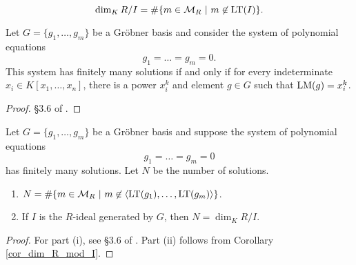 \begin{corollary}
  \label{cor_dim_R_mod_I}
  $$\dim_K R/I = \#\{ m \in \mathcal{M}_R ~|~ m \not\in \operatorname{LT}(I)\}.$$
\end{corollary}
\begin{theorem}
  Let $G = \{g_1, \ldots, g_m\}$ be a Gr\"obner basis and consider the system of polynomial equations
  \[g_1 = \ldots = g_m = 0.\]
  This system has finitely many solutions if and only if for every indeterminate $x_i \in K[x_1, \ldots, x_n]$,
  there is a power $x_i^k$ and element $g \in G$ such that $\operatorname{LM}(g) = x_i^k$.
\end{theorem}
\begin{proof}
  \S 3.6 of \cite{buchberger98}.
\end{proof}

\begin{theorem}
  \label{thm_groebner_num_solutions}
  Let $G = \{g_1, \ldots, g_m\}$ be a Gr\"obner basis and suppose the system of polynomial equations
  \[g_1 = \ldots = g_m = 0\]
  has finitely many solutions.
  Let $N$ be the number of solutions.
  \begin{enumerate}[label=(\roman*)]
    \item $N = \#\{ m \in \mathcal{M}_R ~|~ m \not\in \left\langle \operatorname{LT}(g_1), \ldots, \operatorname{LT}(g_m) \right\rangle \}$.
    \item If $I$ is the $R$-ideal generated by $G$, then $N = \dim_K R/I$.
  \end{enumerate}
\end{theorem}
\begin{proof}
  For part (i), see \S 3.6 of \cite{buchberger98}.
  Part (ii) follows from Corollary \ref{cor_dim_R_mod_I}.
\end{proof}
